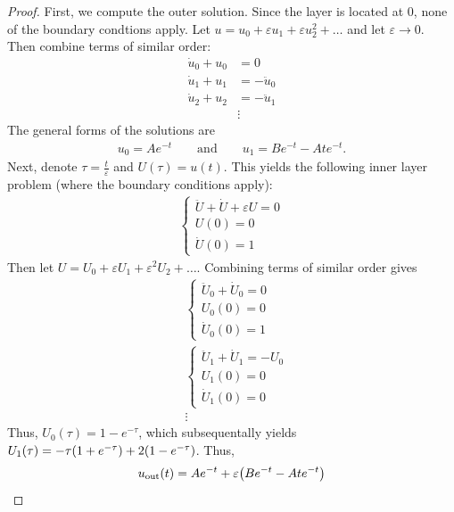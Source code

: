 \documentclass{article} %
\theoremstyle{plain}
\newcommand{\E}{\varepsilon}
\numberwithin{equation}{section} %
\numberwithin{figure}{section} %
\numberwithin{table}{section} %
\begin{document}
\begin{proof}
    First, we compute the outer solution.  Since the layer is located at $0$, none of the boundary condtions apply.  Let $u = u_0 + \E u_1 + \E u_2^2 + \dots$ and let $\E \rightarrow 0$.  Then combine terms of similar order:
    \begin{align*}
        \dot{u}_0 + u_0 &= 0 \\
        \dot{u}_1 + u_1 &= -\ddot{u}_0 \\
        \dot{u}_2 + u_2 &= -\ddot{u}_1 \\
        &\vdots
    \end{align*}
    The general forms of the solutions are
    \begin{align*}
        u_0 = Ae^{-t} \qquad \text{and} \qquad u_1 = Be^{-t} - Ate^{-t}.
    \end{align*}
    Next, denote $\tau = \frac{t}{\E}$ and $U(\tau) = u(t)$.  This yields the following inner layer problem (where the boundary conditions apply):
    \begin{align*}
        \begin{cases}
            \ddot{U} + \dot{U} + \E U = 0 \\
            U(0) = 0 \\
            \dot{U}(0) = 1
        \end{cases}
    \end{align*}
    Then let $U = U_0 + \E U_1 + \E^2 U_2 + \dots$.  Combining terms of similar order gives
    \begin{align*}
        &\begin{cases}
            \ddot{U}_0 + \dot{U}_0 = 0 \\
            U_0(0) = 0 \\
            \dot{U}_0(0) = 1
        \end{cases}\\
        &\begin{cases}
            \ddot{U}_1 + \dot{U}_1 = -U_0 \\
            U_1(0) = 0 \\
            \dot{U}_1(0) = 0
        \end{cases} \\
        &\vdots
    \end{align*}
    Thus, $U_0(\tau) = 1 - e^{-\tau}$, which subsequentally yields $U_1(\tau) = -\tau\qty(1 + e^{-\tau}) + 2\qty(1 - e^{-\tau})$.  Thus,
    \begin{align*}
        u_{\text{out}}(t) &= Ae^{-t} + \E\qty(Be^{-t} - Ate^{-t}) \\

\end{align*}
\end{proof}
\end{document}
